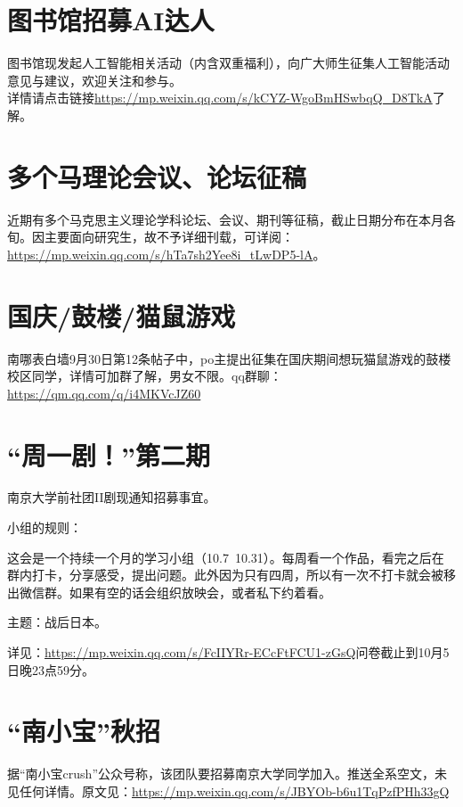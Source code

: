 \documentclass[letterpaper, 12pt]{article}
\begin{document}
\begin{multicols}{2}
\section{图书馆招募AI达人}
图书馆现发起人工智能相关活动（内含双重福利），向广大师生征集人工智能活动意见与建议，欢迎关注和参与。\\
详情请点击链接\url{https://mp.weixin.qq.com/s/kCYZ-WgoBmHSwbqQ_D8TkA}了解。\\
\section{多个马理论会议、论坛征稿}
近期有多个马克思主义理论学科论坛、会议、期刊等征稿，截止日期分布在本月各旬。因主要面向研究生，故不予详细刊载，可详阅：\url{https://mp.weixin.qq.com/s/hTa7sh2Yee8i_tLwDP5-lA}。

\section{国庆/鼓楼/猫鼠游戏}
南哪表白墙9月30日第12条帖子中，po主提出征集在国庆期间想玩猫鼠游戏的鼓楼校区同学，详情可加群了解，男女不限。qq群聊：\url{https://qm.qq.com/q/i4MKVcJZ60
}
\section{“周一剧！”第二期}
南京大学前社团II剧现通知招募事宜。

小组的规则：

这会是一个持续一个月的学习小组（10.7~10.31）。每周看一个作品，看完之后在群内打卡，分享感受，提出问题。此外因为只有四周，所以有一次不打卡就会被移出微信群。如果有空的话会组织放映会，或者私下约着看。

主题：战后日本。

详见：\url{https://mp.weixin.qq.com/s/FcIIYRr-ECcFtFCU1-zGsQ}问卷截止到10月5日晚23点59分。

\section{“南小宝”秋招}
据“南小宝crush”公众号称，该团队要招募南京大学同学加入。推送全系空文，未见任何详情。原文见：\url{https://mp.weixin.qq.com/s/JBYOb-b6u1TqPzfPHh33gQ}
\end{multicols} 
\end{document}
